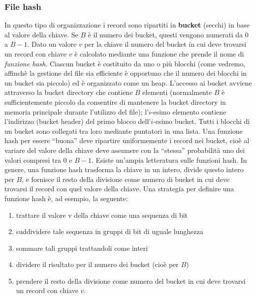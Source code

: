 \subsubsection{File hash}
In questo tipo di organizzazione i record sono ripartiti in \textbf{bucket} (secchi) in base al valore della
chiave. Se $B$ è il numero dei bucket, questi vengono numerati da $0$ a $B-1$. Dato un valore $v$ per la
chiave il numero del bucket in cui deve trovarsi un record con chiave $v$ è calcolato mediante una
funzione che prende il nome di \emph{funzione hash}.
Ciascun bucket è costituito da uno o più blocchi (come vedremo, affinchè la gestione del file sia
efficiente è opportuno che il numero dei blocchi in un bucket sia piccolo) ed è organizzato come un
heap. L'accesso ai bucket avviene attraverso la bucket directory che contiene $B$ elementi
(normalmente $B$ è sufficientemente piccolo da consentire di mantenere la bucket directory in
memoria principale durante l'utilizzo del file); l'$i$-esimo elemento contiene l'indirizzo (bucket
header) del primo blocco dell'$i$-esimo bucket. Tutti i blocchi di un bucket sono collegati tra loro
mediante puntatori in una lista.
Una funzione hash per essere ``buona'' deve ripartire uniformemente i record nei bucket, cioè al
variare del valore della chiave deve assumere con la ``stessa'' probabilità uno dei valori compresi tra
$0$ e $B-1$. Esiste un'ampia letteratura sulle funzioni hash. In genere, una funzione hash trasforma la
chiave in un intero, divide questo intero per $B$, e fornisce il resto della divisione come numero di
bucket in cui deve trovarsi il record con quel valore della chiave. Una strategia per definire una
funzione hash è, ad esempio, la seguente:
\begin{enumerate}
 \item trattare il valore v della chiave come una sequenza di bit
 \item suddividere tale sequenza in gruppi di bit di uguale lunghezza
 \item sommare tali gruppi trattandoli come interi
 \item dividere il risultato per il numero dei bucket (cioè per $B$)
 \item prendere il resto della divisione come numero del bucket in cui deve trovarsi un record con
chiave $v$.
\end{enumerate}

